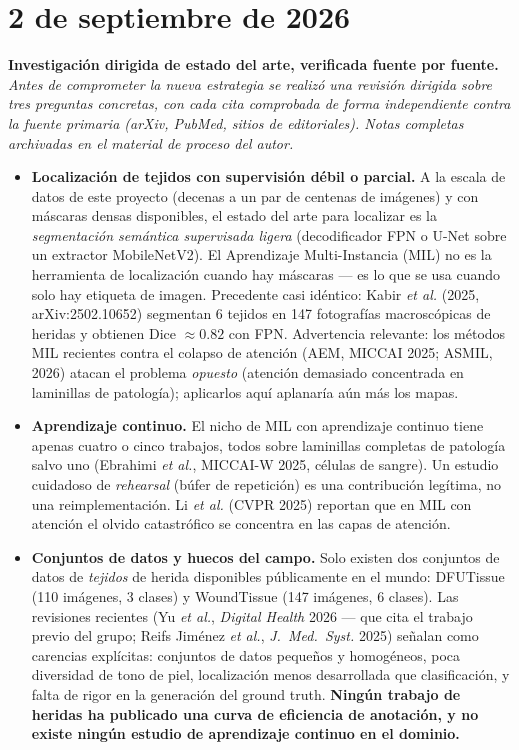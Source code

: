 \documentclass[12pt,letterpaper]{report}
\newcommand{\entrada}[2]{%
    \vspace{0.6em}
    \noindent\textbf{#1.} \textit{#2}
    \vspace{0.3em}
    \par
}
\begin{document}
\section{2 de septiembre de 2026}

\entrada{Investigación dirigida de estado del arte, verificada fuente por fuente}{Antes de comprometer
la nueva estrategia se realizó una revisión dirigida sobre tres preguntas concretas, con cada cita
comprobada de forma independiente contra la fuente primaria (arXiv, PubMed, sitios de editoriales).
Notas completas archivadas en el material de proceso del autor.}

\begin{itemize}[leftmargin=1.5em]
    \item \textbf{Localización de tejidos con supervisión débil o parcial.} A la escala de datos de
        este proyecto (decenas a un par de centenas de imágenes) y con máscaras densas disponibles,
        el estado del arte para localizar es la \emph{segmentación semántica supervisada ligera}
        (decodificador FPN o U-Net sobre un extractor MobileNetV2). El Aprendizaje Multi-Instancia
        (MIL) no es la herramienta de localización cuando hay máscaras --- es lo que se usa cuando
        solo hay etiqueta de imagen. Precedente casi idéntico: Kabir \emph{et al.} (2025,
        arXiv:2502.10652) segmentan 6 tejidos en 147 fotografías macroscópicas de heridas y obtienen
        Dice $\approx 0.82$ con FPN. Advertencia relevante: los métodos MIL recientes contra el
        colapso de atención (AEM, MICCAI 2025; ASMIL, 2026) atacan el problema \emph{opuesto}
        (atención demasiado concentrada en laminillas de patología); aplicarlos aquí aplanaría aún
        más los mapas.
    \item \textbf{Aprendizaje continuo.} El nicho de MIL con aprendizaje continuo tiene apenas cuatro
        o cinco trabajos, todos sobre laminillas completas de patología salvo uno (Ebrahimi
        \emph{et al.}, MICCAI-W 2025, células de sangre). Un estudio cuidadoso de \emph{rehearsal}
        (búfer de repetición) es una contribución legítima, no una reimplementación. Li \emph{et al.}
        (CVPR 2025) reportan que en MIL con atención el olvido catastrófico se concentra en las capas
        de atención.
    \item \textbf{Conjuntos de datos y huecos del campo.} Solo existen dos conjuntos de datos de
        \emph{tejidos} de herida disponibles públicamente en el mundo: DFUTissue (110 imágenes, 3
        clases) y WoundTissue (147 imágenes, 6 clases). Las revisiones recientes (Yu \emph{et al.},
        \emph{Digital Health} 2026 --- que cita el trabajo previo del grupo; Reifs Jiménez
        \emph{et al.}, \emph{J.\ Med.\ Syst.} 2025) señalan como carencias explícitas: conjuntos de
        datos pequeños y homogéneos, poca diversidad de tono de piel, localización menos desarrollada
        que clasificación, y falta de rigor en la generación del ground truth. \textbf{Ningún trabajo
        de heridas ha publicado una curva de eficiencia de anotación, y no existe ningún estudio de
        aprendizaje continuo en el dominio.}
\end{itemize}
\end{document}
